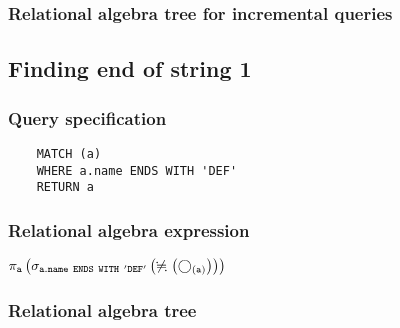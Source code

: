 	\subsubsection*{Relational algebra tree for incremental queries}

	\subsection{Finding end of string 1}

	\subsubsection*{Query specification}

	\begin{lstlisting}
	MATCH (a)
	WHERE a.name ENDS WITH 'DEF'
	RETURN a
	\end{lstlisting}


	\subsubsection*{Relational algebra expression}

	$\projection{\var{a}} \left(\selection{\mathtt{a.name~ENDS~WITH~'DEF'}} \left(\alldifferent{} \left(\getvertices{a}{}\right)\right)\right)$

	\subsubsection*{Relational algebra tree}


